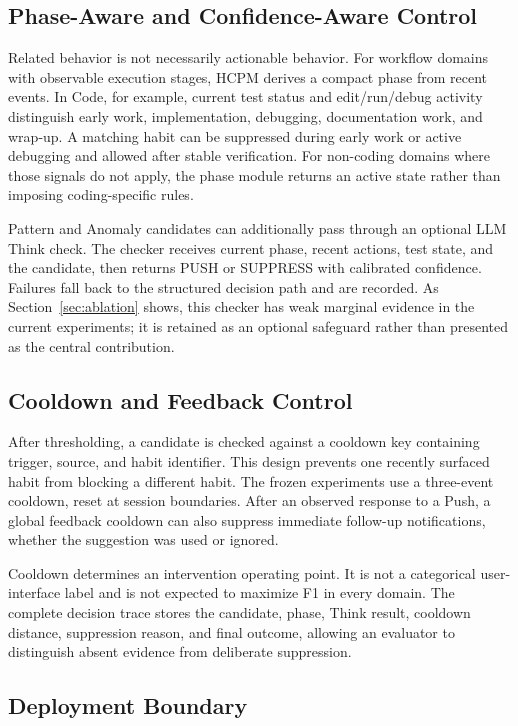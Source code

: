 \documentclass[sigconf,anonymous,review]{acmart}
\newcommand{\system}{HCPM}
\begin{document}
\subsection{Phase-Aware and Confidence-Aware Control}

Related behavior is not necessarily actionable behavior.
For workflow domains with observable execution stages, \system{} derives a compact phase from recent events.
In Code, for example, current test status and edit/run/debug activity distinguish early work, implementation, debugging, documentation work, and wrap-up.
A matching habit can be suppressed during early work or active debugging and allowed after stable verification.
For non-coding domains where those signals do not apply, the phase module returns an active state rather than imposing coding-specific rules.

Pattern and Anomaly candidates can additionally pass through an optional LLM Think check.
The checker receives current phase, recent actions, test state, and the candidate, then returns PUSH or SUPPRESS with calibrated confidence.
Failures fall back to the structured decision path and are recorded.
As Section~\ref{sec:ablation} shows, this checker has weak marginal evidence in the current experiments; it is retained as an optional safeguard rather than presented as the central contribution.

\subsection{Cooldown and Feedback Control}

After thresholding, a candidate is checked against a cooldown key containing trigger, source, and habit identifier.
This design prevents one recently surfaced habit from blocking a different habit.
The frozen experiments use a three-event cooldown, reset at session boundaries.
After an observed response to a Push, a global feedback cooldown can also suppress immediate follow-up notifications, whether the suggestion was used or ignored.

Cooldown determines an intervention operating point.
It is not a categorical user-interface label and is not expected to maximize F1 in every domain.
The complete decision trace stores the candidate, phase, Think result, cooldown distance, suppression reason, and final outcome, allowing an evaluator to distinguish absent evidence from deliberate suppression.

\subsection{Deployment Boundary}
\end{document}
